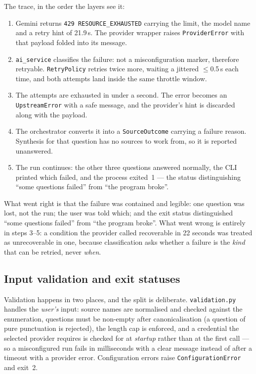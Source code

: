 \documentclass[10pt,a4paper]{article}
\begin{document}
The trace, in the order the layers see it:

\begin{enumerate}[leftmargin=1.6em,itemsep=0.15em]
  \item Gemini returns \texttt{429 RESOURCE\_EXHAUSTED} carrying the limit, the model name and a
        retry hint of 21.9\,s. The provider wrapper raises \texttt{ProviderError} with that
        payload folded into its message.
  \item \texttt{ai\_service} classifies the failure: not a misconfiguration marker, therefore
        retryable. \texttt{RetryPolicy} retries twice more, waiting a jittered $\leq$0.5\,s each
        time, and both attempts land inside the same throttle window.
  \item The attempts are exhausted in under a second. The error becomes an \texttt{UpstreamError}
        with a safe message, and the provider's hint is discarded along with the payload.
  \item The orchestrator converts it into a \texttt{SourceOutcome} carrying a failure reason.
        Synthesis for that question has no sources to work from, so it is reported unanswered.
  \item The run continues: the other three questions answered normally, the CLI printed which
        failed, and the process exited~1 --- the status distinguishing ``some questions failed''
        from ``the program broke''.
\end{enumerate}

What went right is that the failure was contained and legible: one question was lost, not the
run; the user was told which; and the exit status distinguished ``some questions failed'' from
``the program broke''. What went wrong is entirely in steps 3--5: a condition the provider called
recoverable in 22 seconds was treated as unrecoverable in one, because classification asks
whether a failure is the \emph{kind} that can be retried, never \emph{when}.

\subsection{Input validation and exit statuses}

Validation happens in two places, and the split is deliberate. \texttt{validation.py} handles
the \emph{user's} input: source names are normalised and checked against the enumeration,
questions must be non-empty after canonicalisation (a question of pure punctuation is rejected),
the length cap is enforced, and a credential the selected provider requires is checked for at
\emph{startup} rather than at the first call --- so a misconfigured run fails in milliseconds
with a clear message instead of after a timeout with a provider error. Configuration errors
raise \texttt{ConfigurationError} and exit~2.
\end{document}
